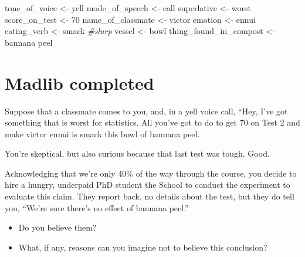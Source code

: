 \documentclass[
]{book}
\newenvironment{Shaded}{\begin{snugshade}}{\end{snugshade}}
\newcommand{\CommentTok}[1]{\textcolor[rgb]{0.56,0.35,0.01}{\textit{#1}}}
\newcommand{\NormalTok}[1]{#1}
\newcommand{\OtherTok}[1]{\textcolor[rgb]{0.56,0.35,0.01}{#1}}
\newcommand{\StringTok}[1]{\textcolor[rgb]{0.31,0.60,0.02}{#1}}
\providecommand{\tightlist}{%
  \setlength{\itemsep}{0pt}\setlength{\parskip}{0pt}}
\theoremstyle{definition}
\theoremstyle{definition}
\theoremstyle{definition}
\theoremstyle{definition}
\theoremstyle{remark}
\begin{document}
\begin{Shaded}
\begin{Highlighting}[]
\NormalTok{tone\_of\_voice     }\OtherTok{\textless{}{-}} \StringTok{\textquotesingle{}yell\textquotesingle{}}
\NormalTok{mode\_of\_speech    }\OtherTok{\textless{}{-}} \StringTok{\textquotesingle{}call\textquotesingle{}}
\NormalTok{superlative       }\OtherTok{\textless{}{-}} \StringTok{\textquotesingle{}worst\textquotesingle{}}
\NormalTok{score\_on\_test     }\OtherTok{\textless{}{-}} \StringTok{\textquotesingle{}70\textquotesingle{}}
\NormalTok{name\_of\_classmate }\OtherTok{\textless{}{-}} \StringTok{\textquotesingle{}victor\textquotesingle{}}
\NormalTok{emotion           }\OtherTok{\textless{}{-}} \StringTok{\textquotesingle{}ennui\textquotesingle{}}
\NormalTok{eating\_verb       }\OtherTok{\textless{}{-}} \StringTok{\textquotesingle{}smack\textquotesingle{}} \CommentTok{\#slurp}
\NormalTok{vessel            }\OtherTok{\textless{}{-}} \StringTok{\textquotesingle{}bowl\textquotesingle{}}
\NormalTok{thing\_found\_in\_compost }\OtherTok{\textless{}{-}} \StringTok{\textquotesingle{}bannana peel\textquotesingle{}}
\end{Highlighting}
\end{Shaded}

\hypertarget{madlib-completed}{%
\section{Madlib completed}\label{madlib-completed}}

Suppose that a classmate comes to you, and, in a yell voice call, ``Hey, I've got something that is worst for statistics. All you've got to do to get 70 on Test 2 and make victor ennui is smack this bowl of bannana peel.

You're skeptical, but also curious because that last test was tough. Good.

Acknowledging that we're only 40\% of the way through the course, you decide to hire a hungry, underpaid PhD student the School to conduct the experiment to evaluate this claim. They report back, no details about the test, but they do tell you, ``We're sure there's no effect of bannana peel.''

\begin{itemize}
\tightlist
\item
  Do you believe them?
\item
  What, if any, reasons can you imagine not to believe this conclusion?
\end{itemize}
\end{document}
